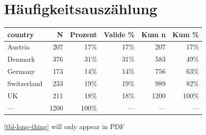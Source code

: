 \documentclass[
  a4paper,
  DIV=11,
  numbers=noendperiod]{scrartcl}
\begin{document}
\section{Häufigkeitsauszählung}\label{huxe4ufigkeitsauszuxe4hlung}

\begin{table}
\fontsize{13.5pt}{16.2pt}\selectfont
\begin{tabular*}{\linewidth}{@{\extracolsep{\fill}}lrrrrr}
\toprule
country & N & Prozent & Valide \% & Kum n & Kum \% \\ 
\midrule\addlinespace[2.5pt]
Austria & 207 & 17\% & 17\% & 207 & 17\% \\ 
Denmark & 376 & 31\% & 31\% & 583 & 49\% \\ 
Germany & 173 & 14\% & 14\% & 756 & 63\% \\ 
Switzerland & 233 & 19\% & 19\% & 989 & 82\% \\ 
UK & 211 & 18\% & 18\% & 1200 & 100\% \\ 
{\textcolor[HTML]{999999}{—}} & {\textcolor[HTML]{999999}{1200}} & {\textcolor[HTML]{999999}{100\%}} & {\textcolor[HTML]{999999}{---}} & {\textcolor[HTML]{999999}{—}} & {\textcolor[HTML]{999999}{---}} \\ 
\bottomrule
\end{tabular*}
\end{table}

\ref{tbl-long-thing} will only appear in PDF
\end{document}

